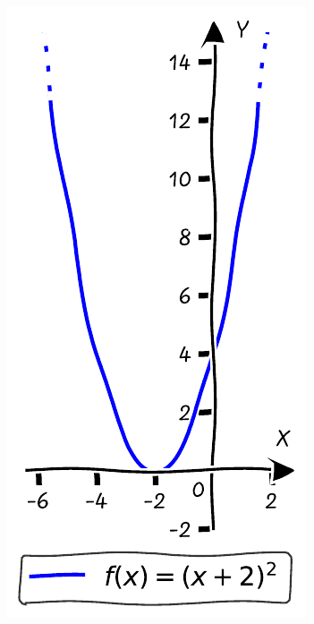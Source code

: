 \documentclass{tufte-handout}
\begin{document}
\begin{figure}[h]
  \begin{minipage}{0.19\textwidth}
    \includegraphics[width=\linewidth]{./graphs/quadratic_func_lsh_2.pdf}
    \label{fig:first}

\end{minipage}
\end{figure}
\end{document}
